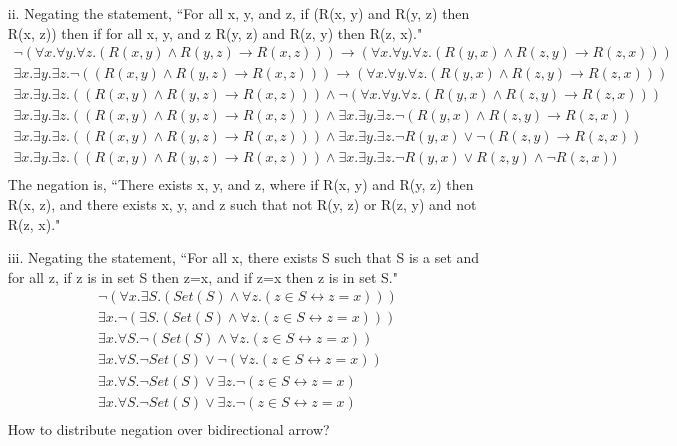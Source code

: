 \documentclass[10pt,letter]{article}
\begin{document}
\begin{enumerate}
\item[ii.] Negating the statement, ``For all x, y, and z, if (R(x, y) and R(y, z) then R(x, z)) then if for all x, y, and z R(y, z) and R(z, y) then R(z, x)."
\begin{gather}
\neg(\forall x. \forall y. \forall z. (R(x, y) \wedge R(y, z) \rightarrow R(x, z))) \rightarrow (\forall x. \forall y. \forall z. (R(y, x) \wedge R(z, y) \rightarrow R(z, x)))\\
\exists x. \exists y. \exists z. \neg((R(x, y) \wedge R(y, z) \rightarrow R(x, z))) \rightarrow (\forall x. \forall y. \forall z. (R(y, x) \wedge R(z, y) \rightarrow R(z, x)))\\
\exists x. \exists y. \exists z. ((R(x, y) \wedge R(y, z) \rightarrow R(x, z))) \wedge \neg(\forall x. \forall y. \forall z. (R(y, x) \wedge R(z, y) \rightarrow R(z, x)))\\
\exists x. \exists y. \exists z. ((R(x, y) \wedge R(y, z) \rightarrow R(x, z))) \wedge \exists x. \exists y. \exists z. \neg(R(y, x) \wedge R(z, y) \rightarrow R(z, x))\\
\exists x. \exists y. \exists z. ((R(x, y) \wedge R(y, z) \rightarrow R(x, z))) \wedge \exists x. \exists y. \exists z. \neg R(y, x) \vee \neg(R(z, y) \rightarrow R(z, x))\\
\exists x. \exists y. \exists z. ((R(x, y) \wedge R(y, z) \rightarrow R(x, z))) \wedge \exists x. \exists y. \exists z. \neg R(y, x) \vee R(z, y) \wedge \neg R(z, x))\\
\end{gather}
The negation is, ``There exists x, y, and z, where if R(x, y) and R(y, z) then R(x, z), and there exists x, y, and z such that not R(y, z) or R(z, y) and not R(z, x)."

\item[iii.] Negating the statement, ``For all x, there exists S such that S is a set and for all z, if z is in set S then z=x, and if z=x then z is in set S." 
\begin{gather}
\neg(\forall x. \exists S. (Set(S) \wedge \forall z. (z \in S \leftrightarrow z = x)))\\
\exists x. \neg(\exists S. (Set(S) \wedge \forall z. (z \in S \leftrightarrow z = x)))\\
\exists x. \forall S. \neg(Set(S) \wedge \forall z. (z \in S \leftrightarrow z = x))\\\exists x. \forall S. \neg Set(S) \vee \neg(\forall z. (z \in S \leftrightarrow z = x))\\\exists x. \forall S. \neg Set(S) \vee \exists z. \neg(z \in S \leftrightarrow z = x)\\\exists x. \forall S. \neg Set(S) \vee \exists z. \neg(z \in S \leftrightarrow z = x)\\
\end{gather}
How to distribute negation over bidirectional arrow?
\end{enumerate}
\end{document}
